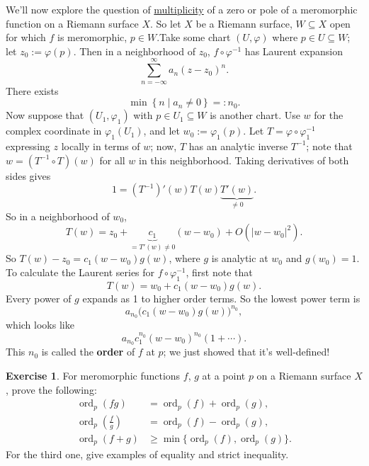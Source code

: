 \documentclass[12pt]{article}
\newcommand\inv[1]{#1^{-1}}
\newcommand\setb[1]{\left \{ #1 \right \}}
\theoremstyle{definition}
\newtheorem{exercise}{Exercise}
\theoremstyle{remark}
\DeclareMathOperator\ord{ord}
\begin{document}
We'll now explore the question of \underline{multiplicity} of a zero or pole of a meromorphic function on a Riemann surface $X$. So let $X$ be a Riemann surface, $W \subseteq X$ open for which $f$ is meromorphic, $p \in W$.Take some chart $(U , \varphi)$ where $p \in U \subseteq W$; let $z_0 := \varphi(p)$. Then in a neighborhood of $z_0$, $f \circ \inv{\varphi}$ has Laurent expansion 
\begin{equation}
    \sum\limits_{n = -\infty}^{\infty} a_n (z - z_0)^n.
\end{equation}
There exists 
\begin{equation}
    \min \setb{n \mid a_n \neq 0} =: n_0.
\end{equation}
Now suppose that $(U_1 , \varphi_1)$ with $p \in U_1 \subseteq W$ is another chart. Use $w$ for the complex coordinate in $\varphi_1(U_1)$, and let $w_0 := \varphi_1(p)$. Let $T = \varphi \circ \inv{\varphi_1}$ expressing $z$ locally in terms of $w$; now, $T$ has an analytic inverse $\inv{T}$; note that $w = \left( \inv{T} \circ T \right)(w)$ for all $w$ in this neighborhood. Taking derivatives of both sides gives 
\begin{equation}
    1 = \left( \inv{T} \right)'(w) T(w) \underbrace{T'(w)}_{\neq 0}.
\end{equation}
So in a neighborhood of $w_0$, 
\begin{equation}
    T(w) = z_0 + \underbrace{c_1}_{= T'(w) \neq 0} (w - w_0) + O \left( |w - w_0|^2 \right).
\end{equation}
So $T(w) - z_0 = c_1(w - w_0)g(w)$, where $g$ is analytic at $w_0$ and $g(w_0) = 1$. To calculate the Laurent series for $f \circ \inv{\varphi_1}$, first note that 
\begin{equation}
    T(w) = w_0 + c_1 (w - w_0) g(w).
\end{equation}
Every power of $g$ expands as 1 to higher order terms. So the lowest power term is 
\begin{equation}
    a_{n_0} \big( c_1 (w - w_0) g(w) \big)^{n_0},
\end{equation}
which looks like 
\begin{equation}
    a_{n_0} c_1^{n_0} (w - w_0)^{n_0} (1 + \dotsb).
\end{equation}
This $n_0$ is called the \textbf{order} of $f$ at $p$; we just showed that it's well-defined!
\begin{exercise}
    For meromorphic functions $f$, $g$ at a point $p$ on a Riemann surface $X$, prove the following:
    \begin{align*}
        \ord_p (f g) & = \ord_p (f) + \ord_p (g), \\
        \ord_p \left( \frac{f}{g} \right) & = \ord_p (f) - \ord_p (g), \\
        \ord_p (f + g) & \geq \min \{ \ord_p (f) , \ord_p (g) \}.
    \end{align*}
    For the third one, give examples of equality and strict inequality.
\end{exercise}
\end{document}
